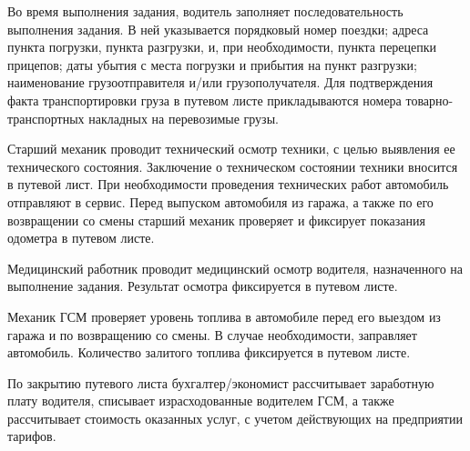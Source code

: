 \documentclass[../nirs.tex]{subfiles}
\begin{document}
Во время выполнения задания, водитель заполняет последовательность выполнения
задания. В ней указывается порядковый номер поездки; адреса пункта погрузки,
пункта разгрузки, и, при необходимости, пункта перецепки прицепов; даты убытия с
места погрузки и прибытия на пункт разгрузки; наименование грузоотправителя
и/или грузополучателя. Для подтверждения факта транспортировки груза в путевом
листе прикладываются номера товарно-транспортных накладных на перевозимые грузы.

Старший механик проводит технический осмотр техники, с целью выявления ее
технического состояния. Заключение о техническом состоянии техники
вносится в путевой лист. При необходимости проведения технических работ
автомобиль отправляют в сервис. Перед выпуском автомобиля из гаража, а также по
его возвращении со смены старший механик проверяет и фиксирует показания
одометра в путевом листе.

Медицинский работник проводит медицинский осмотр водителя, назначенного на
выполнение задания. Результат осмотра фиксируется в путевом листе.

Механик ГСМ проверяет уровень топлива в автомобиле перед его выездом из гаража и
по возвращению со смены. В случае необходимости, заправляет автомобиль.
Количество залитого топлива фиксируется в путевом листе.

По закрытию путевого листа бухгалтер/экономист рассчитывает заработную плату
водителя, списывает израсходованные водителем ГСМ, а также рассчитывает
стоимость оказанных услуг, с учетом действующих на предприятии тарифов.
\end{document}
